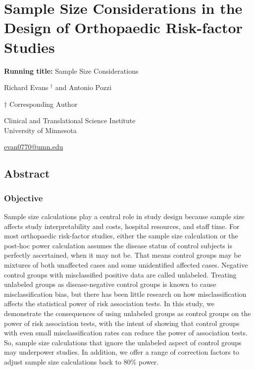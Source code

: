 \documentclass[
]{article}
\author{}
\date{\vspace{-2.5em}}
\begin{document}
\hypertarget{sample-size-considerations-in-the-design-of-orthopaedic-risk-factor-studies}{%
\section{Sample Size Considerations in the Design of Orthopaedic
Risk-factor
Studies}\label{sample-size-considerations-in-the-design-of-orthopaedic-risk-factor-studies}}

\textbf{Running title:} Sample Size Considerations

Richard Evans \({^\dagger}\) and Antonio Pozzi

\({\dagger}\) Corresponding Author

Clinical and Translational Science Institute\\
University of Minnesota

\href{mailto:evan0770@umn.edu}{evan0770@umn.edu}

\newpage

\hypertarget{abstract}{%
\subsection{Abstract}\label{abstract}}

\hypertarget{objective}{%
\subsubsection{Objective}\label{objective}}

Sample size calculations play a central role in study design because
sample size affects study interpretability and costs, hospital
resources, and staff time. For most orthopaedic risk-factor studies,
either the sample size calculation or the post-hoc power calculation
assumes the disease status of control subjects is perfectly ascertained,
when it may not be. That means control groups may be mixtures of both
unaffected cases and some unidentified affected cases. Negative control
groups with misclassified positive data are called unlabeled. Treating
unlabeled groups as disease-negative control groups is known to cause
misclassification bias, but there has been little research on how
misclassification affects the statistical power of risk association
tests. In this study, we demonstrate the consequences of using unlabeled
groups as control groups on the power of risk association tests, with
the intent of showing that control groups with even small
misclassification rates can reduce the power of association tests. So,
sample size calculations that ignore the unlabeled aspect of control
groups may underpower studies. In addition, we offer a range of
correction factors to adjust sample size calculations back to 80\%
power.
\end{document}
